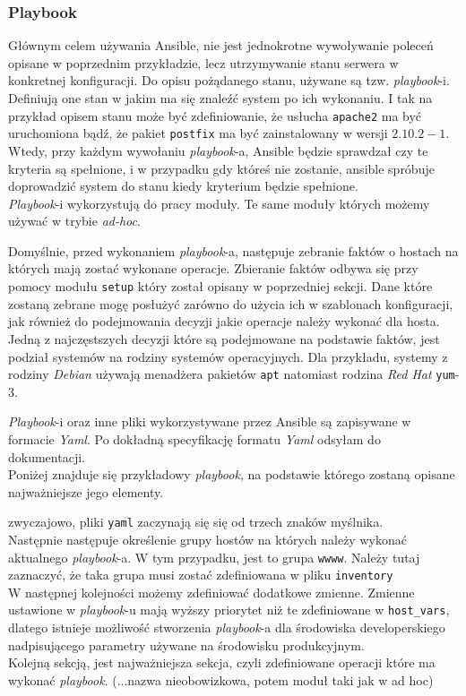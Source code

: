\subsubsection{Playbook}
Głównym celem używania Ansible, nie jest jednokrotne wywoływanie poleceń opisane w poprzednim przykładzie, lecz utrzymywanie stanu serwera w konkretnej konfiguracji.
Do opisu pożądanego stanu, używane są tzw. \textit{playbook}-i.
Definiują one stan w jakim ma się znaleźć system po ich wykonaniu.
I tak na przykład opisem stanu może być zdefiniowanie, że usłucha \texttt{apache2} ma być uruchomiona bądź, że pakiet \texttt{postfix} ma być zainstalowany w wersji $2.10.2-1$.
Wtedy, przy każdym wywołaniu \textit{playbook}-a, Ansible będzie sprawdzał czy te kryteria są spełnione, i w przypadku gdy któreś nie zostanie, ansible spróbuje doprowadzić system do stanu kiedy kryterium będzie spełnione.\\
\textit{Playbook}-i wykorzystują do pracy moduły. Te same moduły których możemy używać w trybie \textit{ad-hoc}.

Domyślnie, przed wykonaniem \textit{playbook}-a, następuje zebranie faktów o hostach na których mają zostać wykonane operacje.
Zbieranie faktów odbywa się przy pomocy modułu \texttt{setup} który został opisany w poprzedniej sekcji.
Dane które zostaną zebrane mogę posłużyć zarówno do użycia ich w szablonach konfiguracji, jak również do podejmowania decyzji jakie operacje należy wykonać dla hosta. Jedną z najczęstszych decyzji które są podejmowane na podstawie faktów, jest podział systemów na rodziny systemów operacyjnych.
Dla przykładu, systemy z rodziny \textit{Debian} używają menadżera pakietów \texttt{apt} natomiast rodzina \textit{Red Hat} \texttt{yum}-3.

\textit{Playbook}-i oraz inne pliki wykorzystywane przez Ansible są zapisywane w formacie \textit{Yaml}.
Po dokładną specyfikację formatu \textit{Yaml} odsyłam do dokumentacji.\\

Poniżej znajduje się przykładowy \textit{playbook}, na podstawie którego zostaną opisane najważniejsze jego elementy.

zwyczajowo, pliki \texttt{yaml} zaczynają się się od trzech znaków myślnika.\\
Następnie następuje określenie grupy hostów na których należy wykonać aktualnego \textit{playbook}-a.
W tym przypadku, jest to grupa \texttt{wwww}.
Należy tutaj zaznaczyć, że taka grupa musi zostać zdefiniowana w pliku \texttt{inventory}\\
W następnej kolejności możemy zdefiniować dodatkowe zmienne.
Zmienne ustawione w \textit{playbook}-u mają wyższy priorytet niż te zdefiniowane w \texttt{host\_vars}, dlatego istnieje możliwość stworzenia \textit{playbook}-a dla środowiska developerskiego nadpisującego parametry używane na środowisku produkcyjnym.\\
Kolejną sekcją, jest najważniejsza sekcja, czyli zdefiniowane operacji które ma wykonać \textit{playbook}.
(...nazwa nieobowizkowa, potem moduł taki jak w ad hoc)
